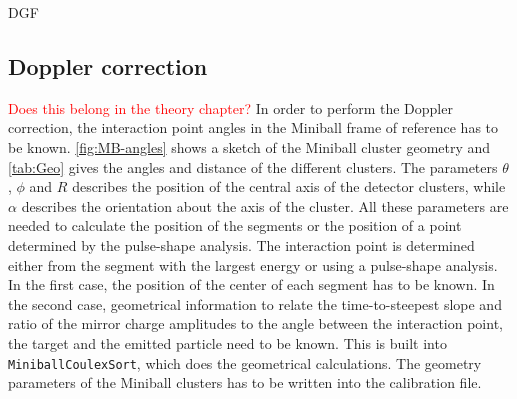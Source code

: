 \documentclass[twoside,english]{uiofysmaster/uiofysmaster}
\newcommand{\ga}{$\gamma$}
\let\orgautoref\autoref
\renewcommand{\autoref}
        {%
		 \def\subsectionautorefname{Section}%
		 \def\subsubsectionautorefname{Section}%
          \orgautoref}
\begin{document}
\begin{table}[ht] 
	\centering 
	\caption{DGF}
	
	\label{tab:DGF}
\end{table}





\subsection{Doppler correction}\label{ssec:Doppler}
\textcolor{red}{Does this belong in the theory chapter?}\newline
In order to perform the Doppler correction, the interaction point angles in the Miniball frame of reference has to be known. 
\autoref{fig:MB-angles} shows a sketch of the Miniball cluster geometry and \autoref{tab:Geo} gives the angles and distance of the different clusters.
The parameters $\theta$, $\phi$ and $R$ describes the position of the central axis of the detector clusters, while $\alpha$ describes the orientation about the axis of the cluster. All these parameters are needed to calculate the position of the segments or the position of a point determined by the pulse-shape analysis. 
The interaction point is determined either from the segment with the largest energy or using a pulse-shape analysis. 
In the first case, the position of the center of each segment has to be known.
In the second case, geometrical information to relate the time-to-steepest slope and ratio of the mirror charge amplitudes to the angle between the interaction point, the target and the emitted particle need to be known. 
This is built into \texttt{MiniballCoulexSort}, which does the geometrical calculations. 
The geometry parameters of the Miniball clusters has to be written into the calibration file. 
\end{document}
